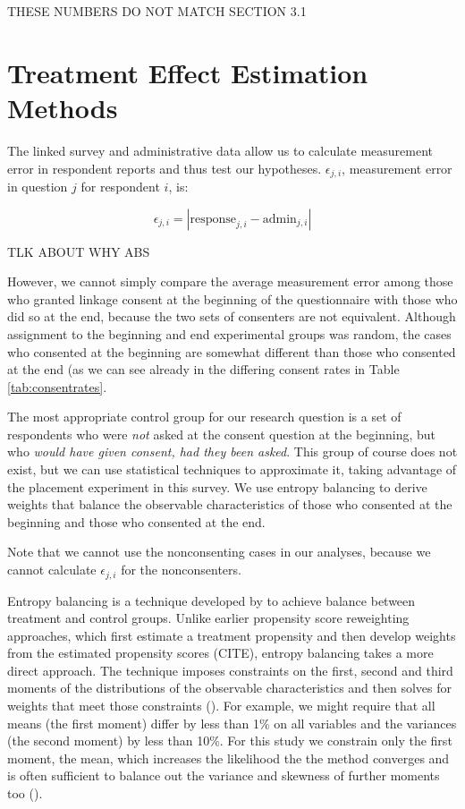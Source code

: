 THESE NUMBERS DO NOT MATCH SECTION 3.1


\section{Treatment Effect Estimation Methods}\label{method}

The linked survey and administrative data allow us to calculate measurement error in respondent reports and thus test our hypotheses. $\epsilon_{j,i}$,  measurement error in question $j$ for respondent $i$, is:

\begin{equation}
\epsilon_{j,i} = |\text{response}_{j,i} - \text{admin}_{j,i}|
\label{eq:hyp_epsi}
\end{equation}

TLK ABOUT WHY ABS

However, we cannot simply compare the average measurement error among those who granted linkage consent at the beginning of the questionnaire with those who did so at the end, because the two sets of consenters are not equivalent.  Although assignment to the beginning and end experimental groups was random, the cases who consented at the beginning are somewhat different than those who consented at the end (as we can see already in the differing consent rates in Table \ref{tab:consentrates}. 

The most appropriate control group for our research question is a set of respondents who were \textit{not} asked at the consent question at the beginning, but who \textit{would have given consent, had they been asked}. This group of course does not exist, but we can use statistical techniques to approximate it, taking advantage of the placement experiment in this survey. We use entropy balancing to derive weights that balance the observable characteristics of those who consented at the beginning and those who consented at the end. 

Note that we cannot use the nonconsenting cases in our analyses, because we cannot calculate $\epsilon_{j,i}$ for the nonconsenters.

Entropy balancing is a technique developed by \cite{Hainmueller12} to achieve balance between treatment and control groups. Unlike earlier propensity score reweighting approaches, which first estimate a treatment propensity and then develop weights from the estimated propensity scores (CITE), entropy balancing takes a more direct approach. The technique imposes constraints on the first, second and third moments of the distributions of the observable characteristics and then solves for weights that meet those constraints (\cite{Hainmueller12}). For example, we might require that all means (the first moment) differ by less than 1\% on all variables and the variances (the second moment) by less than 10\%. For this study we constrain only the first moment, the mean, which increases the likelihood the the method converges and is often sufficient to balance out the variance and skewness of further moments too (\cite{Hainmuelleretal13}).

